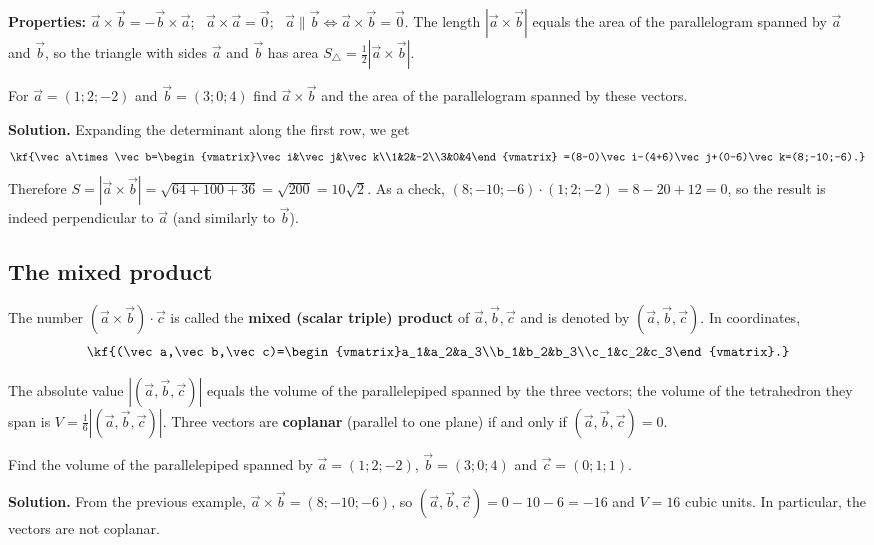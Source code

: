 \textbf{Properties:} $\vec a\times\vec b=-\vec b\times\vec a$; \
$\vec a\times\vec a=\vec 0$; \ $\vec a\parallel\vec b\iff\vec a\times\vec b=\vec 0$.
The length $|\vec a\times\vec b|$ equals the area of the parallelogram
spanned by $\vec a$ and $\vec b$, so the triangle with sides $\vec a$ and
$\vec b$ has area $S_{\triangle}=\frac12|\vec a\times\vec b|$.

\begin{misol}
For $\vec a=(1;2;-2)$ and $\vec b=(3;0;4)$ find $\vec a\times\vec b$ and the
area of the parallelogram spanned by these vectors.

\textbf{Solution.} Expanding the determinant along the first row, we get
\[\kf{\vec a\times\vec b=\begin{vmatrix}\vec i&\vec j&\vec k\\1&2&-2\\3&0&4\end{vmatrix}
=(8-0)\vec i-(4+6)\vec j+(0-6)\vec k=(8;-10;-6).}\]
Therefore $S=|\vec a\times\vec b|=\sqrt{64+100+36}=\sqrt{200}=10\sqrt2$.
As a check, $(8;-10;-6)\cdot(1;2;-2)=8-20+12=0$, so the result is indeed
perpendicular to $\vec a$ (and similarly to $\vec b$).
\end{misol}

\subsection{The mixed product}

\begin{tarif}
The number $(\vec a\times\vec b)\cdot\vec c$ is called the
\textbf{mixed (scalar triple) product} of $\vec a,\vec b,\vec c$ and is
denoted by $(\vec a,\vec b,\vec c)$. In coordinates,
\[\kf{(\vec a,\vec b,\vec c)=\begin{vmatrix}a_1&a_2&a_3\\b_1&b_2&b_3\\c_1&c_2&c_3\end{vmatrix}.}\]
\end{tarif}

\begin{teorema}
The absolute value $|(\vec a,\vec b,\vec c)|$ equals the volume of the
parallelepiped spanned by the three vectors; the volume of the tetrahedron
they span is $V=\frac16|(\vec a,\vec b,\vec c)|$. Three vectors are
\textbf{coplanar} (parallel to one plane) if and only if
$(\vec a,\vec b,\vec c)=0$.
\end{teorema}

\begin{misol}
Find the volume of the parallelepiped spanned by $\vec a=(1;2;-2)$,
$\vec b=(3;0;4)$ and $\vec c=(0;1;1)$.

\textbf{Solution.} From the previous example, $\vec a\times\vec b=(8;-10;-6)$,
so $(\vec a,\vec b,\vec c)=0-10-6=-16$ and $V=16$ cubic units. In
particular, the vectors are not coplanar.
\end{misol}

